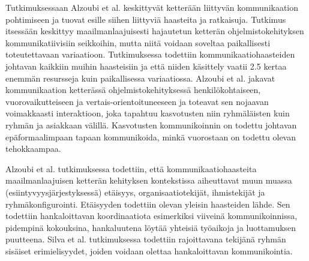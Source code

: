 Tutkimuksessaan Alzoubi et al. \cite{ALZOUBI201622} keskittyvät ketterään liittyvän kommunikaation pohtimiseen ja tuovat esille siihen liittyviä haasteita ja ratkaisuja. Tutkimus itsessään keskittyy maailmanlaajuisesti hajautetun ketterän ohjelmistokehityksen kommunikatiivisiin seikkoihin, mutta niitä voidaan soveltaa paikallisesti toteutettavaan variaatioon. Tutkimuksessa todettiin kommunikaatiohaasteiden johtavan kaikkiin muihin haasteisiin ja että niiden käsittely vaatii 2.5 kertaa enemmän resursseja kuin paikallisessa variaatiossa. Alzoubi et al. jakavat kommunikaation ketterässä ohjelmistokehityksessä henkilökohtaiseen, vuorovaikutteiseen ja vertais-orientoituneeseen ja toteavat sen nojaavan voimakkaasti interaktioon, joka tapahtuu kasvotusten niin ryhmäläisten kuin ryhmän ja asiakkaan välillä. Kasvotusten kommunikoinnin on todettu johtavan epäformaalimpaan tapaan kommunikoida, minkä vuorostaan on todettu olevan tehokkaampaa.

Alzoubi et al. tutkimuksessa \cite{ALZOUBI201622} todettiin, että kommunikaatiohaasteita maailmanlaajuisen ketterän kehityksen kontekstissa aiheuttavat muun muassa (esiintyvyysjärjestyksessä) etäisyys, organisaatiotekijät, ihmistekijät ja ryhmäkonfigurointi. Etäisyyden todettiin olevan yleisin haasteiden lähde. Sen todettiin hankaloittavan koordinaatiota esimerkiksi viiveinä kommunikoinnissa, pidempinä kokouksina, hankaluutena löytää yhteisiä työaikoja ja luottamuksen puutteena. Silva et al. tutkimuksessa \cite{SELLERISILVA201520} todettiin rajoittavana tekijänä ryhmän sisäiset erimielisyydet, joiden voidaan olettaa hankaloittavan kommunikointia.
